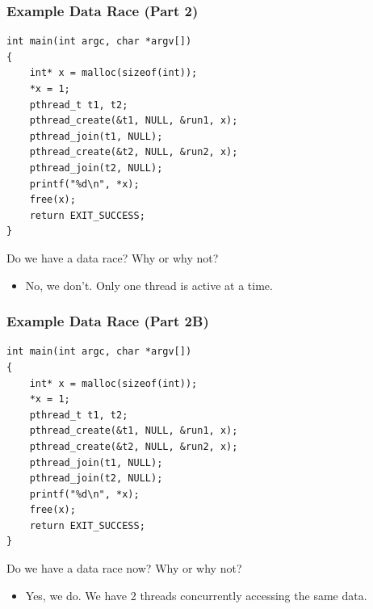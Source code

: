 \documentclass[aspectratio=43]{beamer}
\newenvironment{changemargin}[1]{%
  \begin{list}{}{%
    \setlength{\topsep}{0pt}%
    \setlength{\leftmargin}{#1}%
    \setlength{\rightmargin}{1em}
    \setlength{\listparindent}{\parindent}%
    \setlength{\itemindent}{\parindent}%
    \setlength{\parsep}{\parskip}%
  }%
  \item[]}{\end{list}}
\begin{document}
\begin{frame}[fragile]
  \frametitle{Example Data Race (Part 2)}

  \begin{changemargin}{2.5cm}
  \begin{lstlisting}
int main(int argc, char *argv[])
{
    int* x = malloc(sizeof(int));
    *x = 1;
    pthread_t t1, t2;
    pthread_create(&t1, NULL, &run1, x);
    pthread_join(t1, NULL);
    pthread_create(&t2, NULL, &run2, x);
    pthread_join(t2, NULL);
    printf("%d\n", *x);
    free(x);
    return EXIT_SUCCESS;
}
  \end{lstlisting}

     Do we have a data race? Why or why not?
  
  \begin{itemize}
    \item<2-> No, we don't. Only one thread is active at a time.
  \end{itemize}
   \end{changemargin}


\end{frame}

\begin{frame}[fragile]
  \frametitle{Example Data Race (Part 2B)}

  \begin{changemargin}{2.5cm}
  \begin{lstlisting}
int main(int argc, char *argv[])
{
    int* x = malloc(sizeof(int));
    *x = 1;
    pthread_t t1, t2;
    pthread_create(&t1, NULL, &run1, x);
    pthread_create(&t2, NULL, &run2, x);
    pthread_join(t1, NULL);
    pthread_join(t2, NULL);
    printf("%d\n", *x);
    free(x);
    return EXIT_SUCCESS;
}
  \end{lstlisting}

    Do we have a data race now? Why or why not?
  \begin{itemize}
    \item <2-> Yes, we do. We have 2 threads concurrently accessing the same data.
  \end{itemize}
   \end{changemargin}

\end{frame}
\end{document}
